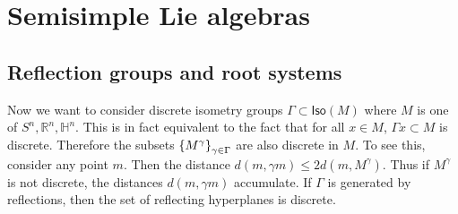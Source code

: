 \documentclass[leqno, openany]{memoir}
\theoremstyle{definition}
\theoremstyle{remark}
\theoremstyle{plain}
\theoremstyle{definition}
\theoremstyle{remark}
\newcommand{\R}{\mathbb{R}}
\renewcommand{\H}{\mathbb{H}}
\begin{document}
\chapter{Semisimple Lie algebras}%
\label{cha:semisimple_lie_algebras}

\section{Reflection groups and root systems}%
\label{sec:reflection_groups}

Now we want to consider discrete isometry groups $\Gamma \subset \mathsf{Iso}(M)$ where $M$ is one of $S^n, \R^n, \H^n$. This is in fact equivalent to the fact that for all $x \in M$, $\Gamma x \subset M$ is discrete. Therefore the subsets $\qty{M^{\gamma}}_{\gamma \in \Gamma}$ are also discrete in $M$. To see this, consider any point $m$. Then the distance $d(m, \gamma m) \leq 2 d(m, M^{\gamma})$. Thus if $M^{\gamma}$ is not discrete, the distances $d(m, \gamma m)$ accumulate. If $\Gamma$ is generated by reflections, then the set of reflecting hyperplanes is discrete.
\end{document}
